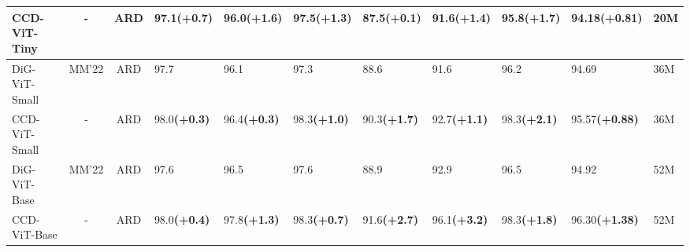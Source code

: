\documentclass[10pt,twocolumn,letterpaper]{article}
\newcommand{\green}[1]{\textcolor[RGB]{96,187,87}{#1}}
\newcommand{\fn}[1]{\footnotesize{#1}}
\newcommand{\gbf}[1]{\green{\bf{\fn{(#1)}}}}
\begin{document}
\begin{table*}[t]
{\begin{tabular}{p{23mm}|c|c|p{10mm}p{12mm}p{12mm}p{10mm}p{10mm}p{10mm}|p{14mm}|p{7mm}}
\rowcolor{mygray}
CCD-ViT-Tiny &-          &ARD &97.1\gbf{+0.7}  &96.0\gbf{+1.6} &97.5\gbf{+1.3} &87.5\gbf{+0.1} &91.6\gbf{+1.4} &95.8\gbf{+1.7} &94.18\gbf{+0.81} & 20M\\
\hline
DiG-ViT-Small~\cite{DiG}&MM'22           &ARD &97.7 &96.1 &97.3 &88.6 &91.6 &96.2 &94.69 & 36M\\ 
\rowcolor{mygray}
CCD-ViT-Small  &-         &ARD &98.0\gbf{+0.3}  &96.4\gbf{+0.3} &98.3\gbf{+1.0} &90.3\gbf{+1.7} &92.7\gbf{+1.1} &98.3\gbf{+2.1} &95.57\gbf{+0.88} & 36M\\
\hline
DiG-ViT-Base~\cite{DiG} &MM'22          &ARD & 97.6 &96.5 &97.6 &88.9 &92.9 &96.5 &94.92 & 52M\\ 
\rowcolor{mygray}
CCD-ViT-Base &-          &ARD &98.0\gbf{+0.4} &97.8\gbf{+1.3} &98.3\gbf{+0.7} &91.6\gbf{+2.7}  &96.1\gbf{+3.2} &98.3\gbf{+1.8} &96.30\gbf{+1.38} & 52M\\
\bottomrule
\end{tabular} }
\label{tb:ssr}
\vspace{-0.5em}
\end{table*}
\end{document}
